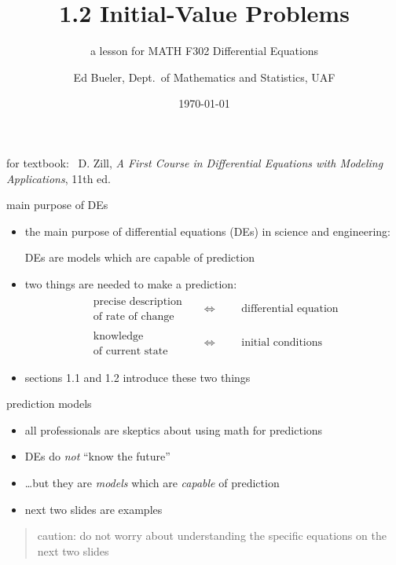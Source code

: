 \documentclass{beamer}
\title{1.2 Initial-Value Problems}
\subtitle{a lesson for MATH F302 Differential Equations}
\author{Ed Bueler, Dept.~of Mathematics and Statistics, UAF}
\date{\tiny \today}
\begin{document}


\begin{frame}
\titlepage

\centerline{\tiny for textbook: \, D. Zill, \emph{A First Course in Differential Equations with Modeling Applications}, 11th ed.}
\end{frame}


\begin{frame}{main purpose of DEs}

\begin{itemize}
\item the main purpose of differential equations (DEs) in science and engineering:

\bigskip

    \centerline{\alert{DEs are models which are capable of prediction}}

\bigskip

\item two things are needed to make a prediction:
\begin{align*}
\begin{matrix}
\text{precise description} \\
\text{of rate of change}
\end{matrix} && \iff && &\text{differential equation} \\
\begin{matrix}
\text{knowledge} \\
\text{of current state}
\end{matrix} && \iff && &\text{initial conditions}
\end{align*}
\item sections 1.1 and 1.2 introduce these two things
\end{itemize}
\end{frame}


\begin{frame}{prediction models}

\begin{itemize}
\item all professionals are skeptics about using math for predictions
\item DEs do \emph{not} ``know the future''
\item \dots but they are \emph{models} which are \emph{capable} of prediction
\item next two slides are examples
\end{itemize}

\bigskip
\begin{quote}
\alert{caution:}  do \alert{not} worry about understanding the specific equations on the next two slides
\end{quote}
\end{frame}
\end{document}
